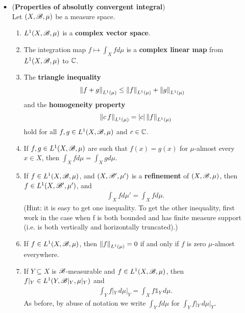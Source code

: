 \documentclass[11pt]{article}
\begin{document}
\begin{itemize}
\item \begin{proposition} (\textbf{Properties of absolutly convergent integral})\\
Let $(X,{\mathscr B}, \mu)$ be a measure space.
\begin{enumerate}
\item $L^1(X, {\mathscr B}, \mu)$ is a \textbf{complex vector space}.
\item The integration map $f \mapsto \int_X f d\mu$ is a \textbf{complex linear map} from $L^1(X, {\mathscr B}, \mu)$ to ${\mathbb C}$.
\item The \textbf{triangle inequality}
\begin{align*}
\left\|f + g\right\|_{L^{1}(\mu)} & \le \left\|f\right\|_{L^{1}(\mu)} + \left\|g\right\|_{L^{1}(\mu)}
\end{align*}
and the \textbf{homogeneity property} 
\begin{align*}
\left\|c\,f\right\|_{L^{1}(\mu)}= \left\lvert c \right\rvert \left\|f\right\|_{L^{1}(\mu)} 
\end{align*} hold for all $f, g \in L^1(X, {\mathscr B}, \mu)$ and $c \in {\mathbb C}$.
\item If $f, g \in L^1(X, {\mathscr B}, \mu)$ are such that $f(x) = g(x)$ for $\mu$-almost every $x \in X$, then $\int_X f d\mu = \int_X g d\mu$.
\item If $f \in L^1(X, {\mathscr B}, \mu)$, and $(X, {\mathscr B}', \mu')$ is a \textbf{refinement} of $(X,{\mathscr B}, \mu)$, then $f \in L^1(X, {\mathscr B}', \mu')$, and 
\begin{align*}
\int_X f d\mu' = \int_X f d\mu.
\end{align*}
(Hint: it is easy to get one inequality. To get the other inequality, first work in the case when f is both bounded and has finite measure support (i.e. is both vertically and horizontally truncated).)
\item If $f \in L^1(X, {\mathscr B}, \mu)$, then $\left\|f\right\|_{L^{1}(\mu)}  = 0$  if and only if $f$ is zero $\mu$-almost everywhere.
\item If $Y \subseteq X$ is ${\mathscr B}$-measurable and $f \in L^1(X, {\mathscr B}, \mu)$, then $f|_{Y} \in L^1(Y, {\mathscr B}|_{Y}, \mu|_{Y})$ and 
\begin{align*}
\int_Y f|_{Y} \, d\mu|_{Y} = \int_X f \mathds{1}_Y \,d\mu.
\end{align*}
As before, by abuse of notation we write $\int_Y f d\mu$ for $\int_Y f|_{Y}\, d\mu|_{Y}$.
\end{enumerate}
\end{proposition}
\end{itemize}
\end{document}

